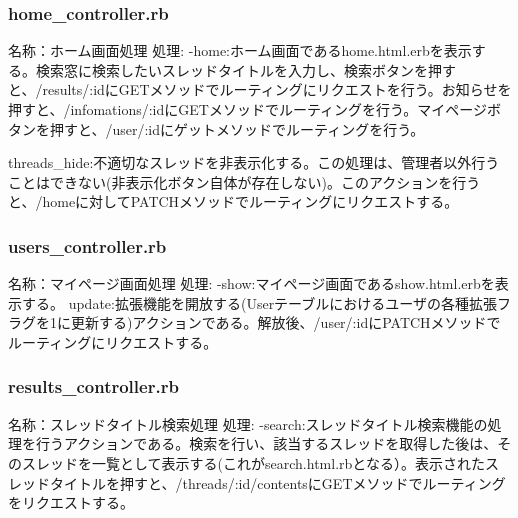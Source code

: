 \documentclass[a4j]{jarticle}
\begin{document}



\subsubsection{home\_controller.rb}
\noindent 名称：ホーム画面処理 \newline
処理:\newline
-home:ホーム画面であるhome.html.erbを表示する。検索窓に検索したいスレッドタイトルを入力し、検索ボタンを押すと、/results/:idにGETメソッドでルーティングにリクエストを行う。お知らせを押すと、/infomations/:idにGETメソッドでルーティングを行う。マイページボタンを押すと、/user/:idにゲットメソッドでルーティングを行う。\newline



threads\_hide:不適切なスレッドを非表示化する。この処理は、管理者以外行うことはできない(非表示化ボタン自体が存在しない)。このアクションを行うと、/homeに対してPATCHメソッドでルーティングにリクエストする。



\subsubsection{users\_controller.rb}
\noindent 名称：マイページ画面処理 \newline
処理:\newline
-show:マイページ画面であるshow.html.erbを表示する。\newline
update:拡張機能を開放する(Userテーブルにおけるユーザの各種拡張フラグを1に更新する)アクションである。解放後、/user/:idにPATCHメソッドでルーティングにリクエストする。


\subsubsection{results\_controller.rb}
\noindent 名称：スレッドタイトル検索処理 \newline
処理:\newline 
-search:スレッドタイトル検索機能の処理を行うアクションである。検索を行い、該当するスレッドを取得した後は、そのスレッドを一覧として表示する(これがsearch.html.rbとなる）。表示されたスレッドタイトルを押すと、/threads/:id/contentsにGETメソッドでルーティングをリクエストする。\newline
\end{document}

